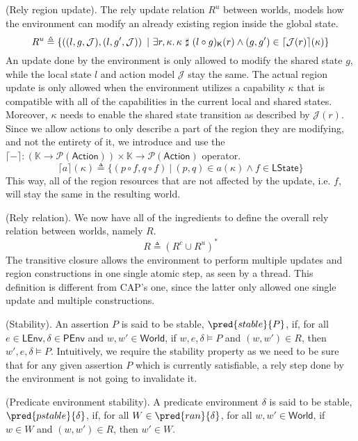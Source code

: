 (Rely region update). The rely update relation $R^u$ between worlds, models how the environment can modify an already existing region inside the global state.
\[
	R^u \triangleq \{ \left( (l, g, \mathcal{J}), (l, g', \mathcal{J}) \right)\ |\ \exists r, \kappa \ldotp  \kappa\ \sharp\ (l \circ g)_\mathsf{K}(r) \land (g, g') \in \lceil \mathcal{J}(r) \rceil (\kappa) \}
\]
An update done by the environment is only allowed to modify the shared state $g$, while the local state $l$ and action model $\mathcal{J}$ stay the same. The actual region update is only allowed when the environment utilizes a capability $\kappa$ that is compatible with all of the capabilities in the current local and shared states. Moreover, $\kappa$ needs to enable the shared state transition as described by $\mathcal{J}(r)$. Since we allow actions to only describe a part of the region they are modifying, and not the entirety of it, we introduce and use the $\lceil - \rceil : \left( \mathbb{K} \rightarrow \mathcal{P}(\mathsf{Action}) \right) \times \mathbb{K} \rightarrow \mathcal{P}(\mathsf{Action})$ operator.
\[
	\lceil a \rceil (\kappa) \triangleq \{ (p \circ f, q \circ f)\ |\ (p, q) \in a(\kappa) \land f \in \mathsf{LState} \}
\]
This way, all of the region resources that are not affected by the update, i.e. $f$, will stay the same in the resulting world.

 (Rely relation). We now have all of the ingredients to define the overall rely relation between worlds, namely $R$.
\[
	R \triangleq (R^c \cup R^u)^*
\]
The transitive closure allows the environment to perform multiple updates and region constructions in one single atomic step, as seen by a thread. This definition is different from CAP's one, since the latter only allowed one single update and multiple constructions.

 (Stability). An assertion $P$ is said to be stable, $\pred{stable}{P}$, if, for all $e \in \mathsf{LEnv}, \delta \in \mathsf{PEnv}$ and $w, w' \in \mathsf{World}$, if $w, e, \delta \vDash P$ and $(w, w') \in R$, then $w', e, \delta \vDash P$. Intuitively, we require the stability property as we need to be sure that for any given assertion $P$ which is currently satisfiable, a rely step done by the environment is not going to invalidate it.

 (Predicate environment stability). A predicate environment $\delta$ is said to be stable, $\pred{pstable}{\delta}$, if, for all $W \in \pred{ran}{\delta}$, for all $w, w' \in \mathsf{World}$, if $w \in W$ and $(w, w') \in R$, then $w' \in W$.

